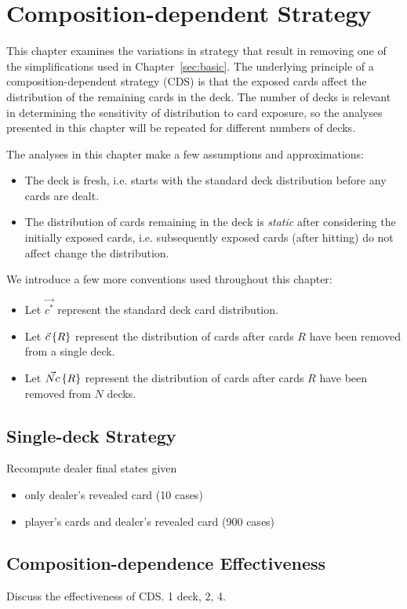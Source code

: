 
\chapter{Composition-dependent Strategy}
\label{sec:composition}

This chapter examines the variations in strategy that result in
removing one of the simplifications used in Chapter~\ref{sec:basic}.
The underlying principle of a composition-dependent strategy (CDS)
is that the exposed cards affect the distribution of the remaining
cards in the deck.
The number of decks is relevant in determining
the sensitivity of distribution to card exposure, 
so the analyses presented in this chapter 
will be repeated for different numbers of decks.

The analyses in this chapter make a few assumptions and approximations:
\begin{itemize}
\item The deck is fresh, i.e. starts with the standard deck distribution before
any cards are dealt.
\item The distribution of cards remaining in the deck is \emph{static} 
after considering the initially exposed cards, i.e. subsequently exposed 
cards (after hitting) do not affect change the distribution.  
\end{itemize}

We introduce a few more conventions used throughout this chapter:
\begin{itemize}
\item Let $\Vec{c^*}$ represent the standard deck card distribution.  
\item Let $\vec{c}\left\{R\right\}$ represent the distribution of cards
	after cards $R$ have been removed from a single deck.
\item Let $\vec{Nc}\left\{R\right\}$ represent the distribution of cards
	after cards $R$ have been removed from $N$ decks.
\end{itemize}

\section{Single-deck Strategy}
\label{sec:composition:strategy}

Recompute dealer final states given
\begin{itemize}
\item only dealer's revealed card (10 cases)
\item player's cards and dealer's revealed card (900 cases)
\end{itemize}

\section{Composition-dependence Effectiveness}
\label{sec:composition:eff}

Discuss the effectiveness of CDS.
1 deck, 2, 4.

